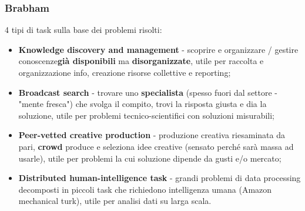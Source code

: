 \documentclass{article}
\begin{document}
    \subsubsection{Brabham}
      4 tipi di task sulla base dei problemi risolti:
      \begin{itemize}
          \item \textbf{Knowledge discovery and management} - scoprire e organizzare / gestire conoscenze\textbf{già disponibili} ma \textbf{disorganizzate}, utile per raccolta e organizzazione info, creazione risorse collettive e reporting;
          \item \textbf{Broadcast search} - trovare uno \textbf{specialista} (spesso fuori dal settore - "mente fresca") che svolga il compito, trovi la risposta giusta e dia la soluzione, utile per problemi tecnico-scientifici con soluzioni misurabili;
          \item \textbf{Peer-vetted creative production} - produzione creativa riesaminata da pari, \textbf{crowd} produce e seleziona idee creative (sensato perché sarà massa ad usarle), utile per problemi la cui soluzione dipende da gusti e/o mercato;
          \item \textbf{Distributed human-intelligence task} - grandi problemi di data processing decomposti in piccoli task che richiedono intelligenza umana (Amazon mechanical turk), utile per analisi dati su larga scala.
      \end{itemize}
\end{document}
